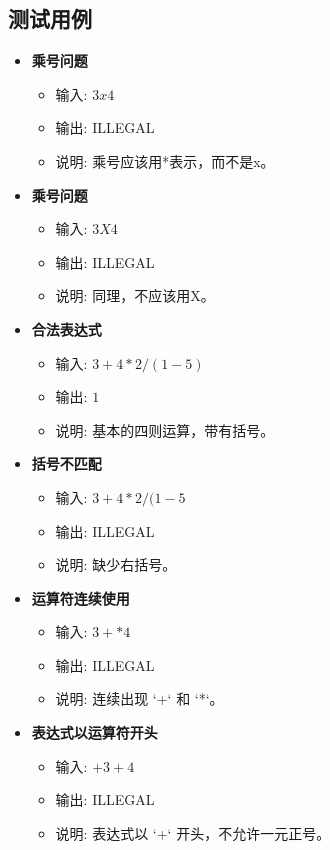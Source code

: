\documentclass{article}
\begin{document}
\subsection{测试用例}
\begin{itemize}
    \item \textbf{乘号问题}
    \begin{itemize}
        \item 输入: \(3 x 4\)
        \item 输出: ILLEGAL
        \item 说明: 乘号应该用*表示，而不是x。
    \end{itemize}
    \item \textbf{乘号问题}
    \begin{itemize}
        \item 输入: \(3 X 4\)
        \item 输出: ILLEGAL
        \item 说明: 同理，不应该用X。
    \end{itemize}
    \item \textbf{合法表达式}
    \begin{itemize}
        \item 输入: \(3 + 4 * 2 / ( 1 - 5 )\)
        \item 输出: \(1\)
        \item 说明: 基本的四则运算，带有括号。
    \end{itemize}
    \item \textbf{括号不匹配}
    \begin{itemize}
        \item 输入: \(3 + 4 * 2 / ( 1 - 5\)
        \item 输出: ILLEGAL
        \item 说明: 缺少右括号。
    \end{itemize}
    \item \textbf{运算符连续使用}
    \begin{itemize}
        \item 输入: \(3 + * 4\)
        \item 输出: ILLEGAL
        \item 说明: 连续出现 `+` 和 `*`。
    \end{itemize}
    \item \textbf{表达式以运算符开头}
    \begin{itemize}
        \item 输入: \(+ 3 + 4\)
        \item 输出: ILLEGAL
        \item 说明: 表达式以 `+` 开头，不允许一元正号。

\end{itemize}
\end{itemize}
\end{document}
